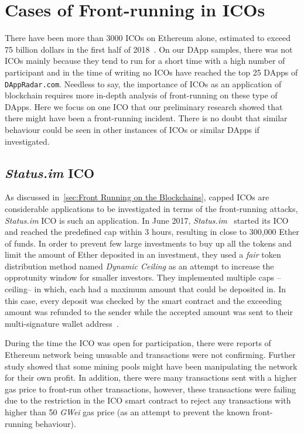 \section{Cases of Front-running in ICOs}  \label{sec:ICOsfrontrunning}

There have been more than 3000 ICOs on Ethereum alone, estimated to exceed 75 billion dollars in the first half of 2018~\cite{zetzsche2018ico}. On our DApp samples, there was not ICOs mainly because they tend to run for a short time with a high number of participant and in the time of writing no ICOs have reached the top 25 DApps of \texttt{DAppRadar.com}. Needless to say, the importance of ICOs as an application of blockchain requires more in-depth analysis of front-running on these type of DApps. %
Here we focus on one ICO that our preliminary research showed that there might have been a front-running incident. There is no doubt that similar behaviour could be seen in other instances of ICOs or similar DApps if investigated.

\subsection{\textit{Status.im} ICO}
As discussed in~\ref{sec:Front Running on the Blockchains}, capped ICOs are considerable applications to be investigated in terms of the front-running attacks, \textit{Status.im} ICO is such an application. In June 2017, \textit{Status.im}~\cite{statuswhitepaper} started its ICO and reached the predefined cap within 3 hours, resulting in close to 300,000 Ether of funds. In order to prevent few large investments to buy up all the tokens and limit the amount of Ether deposited in an investment, they used a \textit{fair} token distribution method named \textit{Dynamic Ceiling} as an attempt to increase the opprotunity window for smaller investors. They implemented multiple caps --ceiling-- in which, each had a maximum amount that could be deposited in. In this case, every deposit was checked by the smart contract and the exceeding amount was refunded to the sender while the accepted amount was sent to their multi-signature wallet address~\cite{statusicoanalysis}. 

During the time the ICO was open for participation, there were reports of Ethereum network being unusable and transactions were not confirming. Further study showed that some mining pools might have been manipulating the network for their own profit. In addition, there were many transactions sent with a higher gas price to front-run other transactions, however, these transactions were failing due to the restriction in the ICO smart contract to reject any transactions with higher than 50 \textit{GWei} gas price (as an attempt to prevent the known front-running behaviour).

